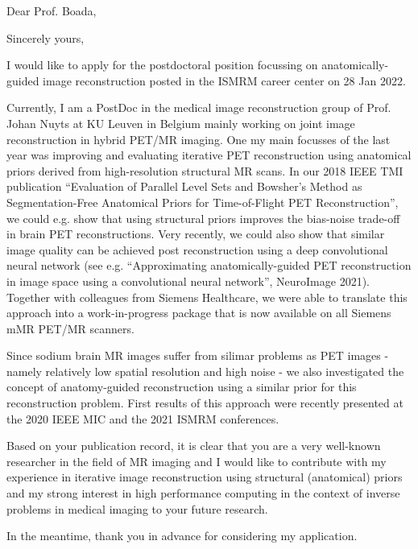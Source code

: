 \date{\today} %
\opening{Dear Prof. Boada,} %
\closing{Sincerely yours,} %

\makelettertitle %

\begin{minipage}{\textwidth} %
\setlength{\parskip}{0.2cm}%

I would like to apply for the postdoctoral position focussing on
anatomically-guided image reconstruction posted in the ISMRM career center
on 28 Jan 2022.

Currently, I am a PostDoc in the medical image reconstruction group of 
Prof. Johan Nuyts at KU Leuven in Belgium mainly working on joint image 
reconstruction in hybrid PET/MR imaging.
One my main focusses of the last year was improving and evaluating 
iterative PET reconstruction using anatomical priors derived from 
high-resolution structural MR scans.
In our 2018 IEEE TMI publication ``Evaluation of Parallel Level Sets and Bowsher’s 
Method as Segmentation-Free Anatomical Priors for Time-of-Flight PET Reconstruction'',
we could e.g. show that using structural priors improves the bias-noise
trade-off in brain PET reconstructions.
Very recently, we could also show that similar image quality can be achieved
post reconstruction using a deep convolutional neural network
(see e.g. ``Approximating anatomically-guided PET reconstruction in image space 
using a convolutional neural network'', NeuroImage 2021).
Together with colleagues from Siemens Healthcare, we were able to translate
this approach into a work-in-progress package that is now available on
all Siemens mMR PET/MR scanners.

Since sodium brain MR images suffer from silimar problems as PET images - namely
relatively low spatial resolution and high noise - we also investigated the
concept of anatomy-guided reconstruction using a similar prior for this
reconstruction problem. 
First results of this approach were recently presented at the 2020 IEEE MIC
and the 2021 ISMRM conferences.

Based on your publication record, it is clear that you are a very well-known
researcher in the field of MR imaging and I would like to contribute with
my experience in iterative image reconstruction using structural
(anatomical) priors and my strong interest in high performance computing in the
context of inverse problems in medical imaging to your future research. 

In the meantime, thank you in advance for considering my application. 

\end{minipage}

